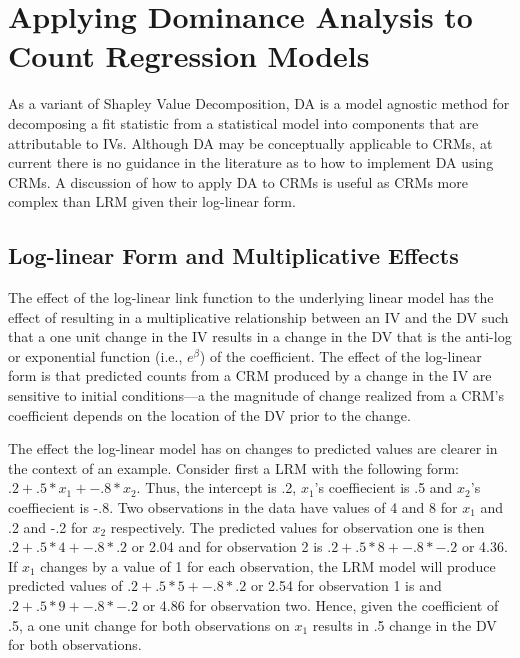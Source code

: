 \documentclass[ShortAfour,times,sageapa]{sagej}
\begin{document}
\section{Applying Dominance Analysis to Count Regression Models}

	As a variant of Shapley Value Decomposition, DA is a model agnostic method for decomposing a fit statistic from a statistical model into components that are attributable to IVs.
	Although DA may be conceptually applicable to CRMs, at current there is no guidance in the literature as to how to implement DA using CRMs.
	A discussion of how to apply DA to CRMs is useful as CRMs more complex than LRM given their log-linear form.  
	
	\subsection{Log-linear Form and Multiplicative Effects}
	
	The effect of the log-linear link function to the underlying linear model has the effect of resulting in a multiplicative relationship between an IV and the DV %
	such that a one unit change in the IV results in a change in the DV that is the anti-log or exponential function (i.e., $e^{\beta}$) of the coefficient.  
	The effect of the log-linear form is that predicted counts from a CRM produced by a change in the IV are sensitive to initial conditions---a the magnitude of change realized from a CRM's coefficient depends on the location of the DV prior to the change.  
	
	The effect the log-linear model has on changes to predicted values are clearer in the context of an example.
	Consider first a LRM with the following form: $.2 + .5*x_1 + -.8*x_2$.  
	Thus, the intercept is .2, $x_1$'s coeffiecient is .5 and $x_2$'s coeffiecient is -.8.  
	Two observations in the data have values of 4 and 8 for $x_1$ and .2 and -.2 for $x_2$ respectively.  
	The predicted values for observation one is then $.2 + .5*4 + -.8*.2$ or 2.04 and for observation 2 is $.2 + .5*8 + -.8*-.2$ or 4.36.  
	If $x_1$ changes by a value of 1 for each observation, the LRM model will produce predicted values of  $.2 + .5*5 + -.8*.2$ or 2.54 for observation 1 is and $.2 + .5*9 + -.8*-.2$ or 4.86 for observation two. 
	Hence, given the coefficient of .5, a one unit change for both observations on $x_1$ results in .5 change in the DV for both observations.
	
\end{document}
